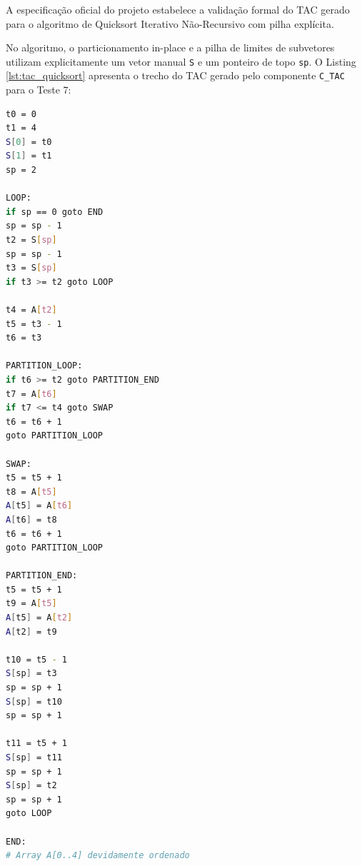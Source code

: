 A especificação oficial do projeto estabelece a validação formal do TAC gerado para o algoritmo de Quicksort Iterativo Não-Recursivo com pilha explícita.

No algoritmo, o particionamento in-place e a pilha de limites de subvetores utilizam explicitamente um vetor manual \texttt{S} e um ponteiro de topo \texttt{sp}. O Listing \ref{lst:tac_quicksort} apresenta o trecho do TAC gerado pelo componente \texttt{C\_TAC} para o Teste 7:

\begin{lstlisting}[language=bash, caption={Código Intermediário (TAC) gerado para o Quicksort Iterativo (Teste 7)}, label={lst:tac_quicksort}]
t0 = 0
t1 = 4
S[0] = t0
S[1] = t1
sp = 2

LOOP:
if sp == 0 goto END
sp = sp - 1
t2 = S[sp]
sp = sp - 1
t3 = S[sp]
if t3 >= t2 goto LOOP

t4 = A[t2]
t5 = t3 - 1
t6 = t3

PARTITION_LOOP:
if t6 >= t2 goto PARTITION_END
t7 = A[t6]
if t7 <= t4 goto SWAP
t6 = t6 + 1
goto PARTITION_LOOP

SWAP:
t5 = t5 + 1
t8 = A[t5]
A[t5] = A[t6]
A[t6] = t8
t6 = t6 + 1
goto PARTITION_LOOP

PARTITION_END:
t5 = t5 + 1
t9 = A[t5]
A[t5] = A[t2]
A[t2] = t9

t10 = t5 - 1
S[sp] = t3
sp = sp + 1
S[sp] = t10
sp = sp + 1

t11 = t5 + 1
S[sp] = t11
sp = sp + 1
S[sp] = t2
sp = sp + 1
goto LOOP

END:
# Array A[0..4] devidamente ordenado
\end{lstlisting}
